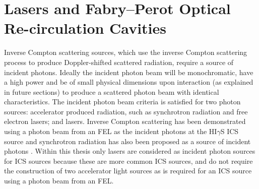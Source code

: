 \documentclass[../main.tex]{subfiles}
\begin{document}
\section{Lasers and Fabry--Perot Optical Re-circulation Cavities}
\label{sec:lasers_fabry_perot}

Inverse Compton scattering sources, which use the inverse Compton scattering process to produce Doppler-shifted scattered radiation, require a source of incident photons. Ideally the incident photon beam will be monochromatic, have a high power and be of small physical dimensions upon interaction (as explained in future sections) to produce a scattered photon beam with identical characteristics. The incident photon beam criteria is satisfied for two photon sources: accelerator produced radiation, such as synchrotron radiation and free electron lasers; and lasers. Inverse Compton scattering has been demonstrated using a photon beam from an FEL as the incident photons at the HI$\gamma$S ICS source \cite{weller2009research} and synchrotron radiation has also been proposed as a source of incident photons \cite{shimada2010inverse}. Within this thesis only lasers are considered as incident photon sources for ICS sources because these are more common ICS sources, and do not require the construction of two accelerator light sources as is required for an ICS source using a photon beam from an FEL.
\end{document}

